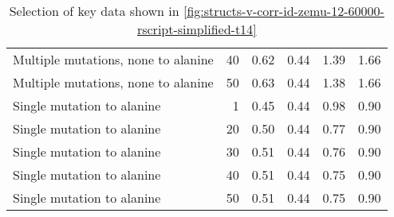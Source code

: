 \begin{table}
\begin{tabular}{lrrrrr}
 Multiple mutations, none to alanine &          40 &          0.62 &                    0.44 &            1.39 &                      1.66 \\
 Multiple mutations, none to alanine &          50 &          0.63 &                    0.44 &            1.38 &                      1.66 \\
          Single mutation to alanine &           1 &          0.45 &                    0.44 &            0.98 &                      0.90 \\
          Single mutation to alanine &          20 &          0.50 &                    0.44 &            0.77 &                      0.90 \\
          Single mutation to alanine &          30 &          0.51 &                    0.44 &            0.76 &                      0.90 \\
          Single mutation to alanine &          40 &          0.51 &                    0.44 &            0.75 &                      0.90 \\
          Single mutation to alanine &          50 &          0.51 &                    0.44 &            0.75 &                      0.90 \\
\bottomrule
\end{tabular}

\caption[]{Selection of key data shown in \cref{fig:structs-v-corr-id-zemu-12-60000-rscript-simplified-t14}}
\label{tab:structs-v-corr-id-zemu-12-60000-rscript-simplified-t14-underlying-data}
\end{table}
